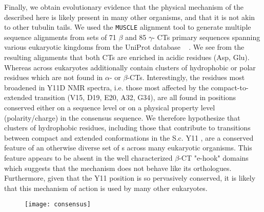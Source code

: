 \begin{figure}
	\thispagestyle{empty}
	\centering     %
	\clearpage
	\label{fig:globular}
\end{figure}


Finally, we obtain evolutionary evidence that the physical mechanism of the \gct described here is likely present in many other organisms, and that it is not akin to other tubulin tails.  We used the \texttt{MUSCLE} alignment tool \cite{edgar2004muscle} to generate multiple sequence alignments from sets of 71 $\beta$ and 85 $\gamma$- CTs primary sequences spanning various eukaryotic kingdoms from the UniProt database ~\cite{apweiler2004uniprot} .  We see from the resulting alignments that both CTs are enriched in acidic residues (Asp, Glu). Whereas \gct across eukaryotes additionally contain clusters of hydrophobic or polar residues which are not found in $\alpha$- or $\beta$-CTs. Interestingly, the residues most broadened in Y11D NMR spectra, i.e. those most affected by the compact-to-extended transition (V15, D19, E20, A32, G34), are all found in positions conserved either on a sequence level or on a physical property level (polarity/charge) in the consensus \gct sequence. We therefore hypothesize that clusters of hydrophobic residues, including those that contribute to transitions between compact and extended conformations in the S.c. Y11 \gct, are a conserved feature of an otherwise diverse set of \gct s across many eukaryotic organisms. This feature appears to be absent in the well characterized $\beta$-CT "e-hook" domains which suggests that the \gct mechanism does not behave like its orthologues.  Furthermore, given that the Y11 position is so pervasively conserved, it is likely that this mechanism of action is used by many other eukaryotes.

\begin{figure}
\centering
\texttt{[image: consensus]}
\label{fig:alignment}
\end{figure}

